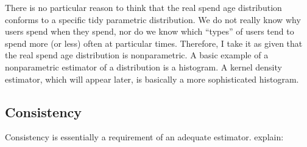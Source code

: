 \documentclass[english]{article}
\begin{document}
There is no particular reason to think that the real spend age distribution
conforms to a specific tidy parametric distribution. We do not really
know why users spend when they spend, nor do we know which ``types''
of users tend to spend more (or less) often at particular times. Therefore,
I take it as given that the real spend age distribution is nonparametric.
A basic example of a nonparametric estimator of a distribution is
a histogram. A kernel density estimator, which will appear later,
is basically a more sophisticated histogram.

\subsection{Consistency\label{subsec:Consistency}}

Consistency is essentially a requirement of an adequate estimator.
\cite{CasellaBerger2002} explain:
\end{document}
